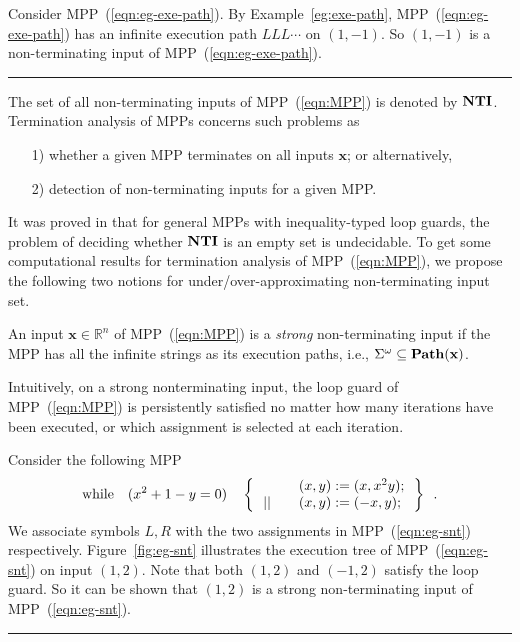 \documentclass{jssc}
\newcommand{\rulex}{\hfill\rule{1mm}{3mm}}
\newcommand{\while}{{\rm while}}
\newcommand{\xx}{\mathbf{x}}
\newcommand{\NTI}{{\bf NTI}}
\begin{document}
\begin{example}\label{eg:nt}
Consider MPP~(\ref{eqn:eg-exe-path}). By Example~\ref{eg:exe-path}, MPP~(\ref{eqn:eg-exe-path}) has an infinite execution path $LLL \cdots$ on $(1,-1)$. So $(1,-1)$ is a non-terminating input of MPP~(\ref{eqn:eg-exe-path}). \rulex
\end{example}

The set of all non-terminating inputs of MPP~(\ref{eqn:MPP}) is denoted by $\NTI$. Termination analysis of MPPs concerns such problems as
\begin{enumerate}
\item[1)] whether a given MPP terminates on all inputs $\xx$; or alternatively,
\item[2)] detection of non-terminating inputs for a given MPP.
\end{enumerate}
It was proved in \cite{bradley:polynomial} that for general MPPs with inequality-typed loop guards, the problem of deciding whether $\NTI$ is an empty set is undecidable. To get some computational results for termination analysis of MPP~(\ref{eqn:MPP}), we propose the following two notions for under/over-approximating non-terminating input set.

\begin{definition}\label{def:SNT}
An input $\xx \in \mathbb{R}^n$ of MPP~(\ref{eqn:MPP}) is a \emph{strong} non-terminating input if the MPP has all the infinite strings as its execution paths, i.e., $\Sigma^{\omega} \subseteq {\bf Path}(\xx)$.
\end{definition}

Intuitively, on a strong nonterminating input, the loop guard of MPP~(\ref{eqn:MPP}) is persistently satisfied no matter how many iterations have been executed, or which assignment is selected at each iteration.

\begin{example}\label{eg:snt}
Consider the following MPP
\begin{equation}\label{eqn:eg-snt}
\while \quad (x^2+1-y=0) \quad \left\{
\begin{array}{ll}
& \quad (x,y) := (x,x^2y); \\
\,|| & \quad (x,y) := (-x,y); \\
\end{array}
\,\right\} \enspace .
\end{equation}
We associate symbols $L,R$ with the two assignments in MPP~(\ref{eqn:eg-snt}) respectively. Figure~\ref{fig:eg-snt} illustrates the execution tree of MPP~(\ref{eqn:eg-snt}) on input $(1,2)$. Note that both $(1,2)$ and $(-1,2)$ satisfy the loop guard. So it can be shown that $(1,2)$ is a strong non-terminating input of MPP~(\ref{eqn:eg-snt}). \rulex
\end{example}
\end{document}
